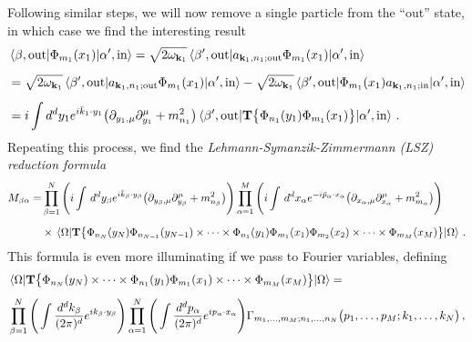 \documentclass{article}
\numberwithin{equation}{subsection}
\begin{document}
Following similar steps, we will now remove a single particle from the ``out'' state, in which case we find the interesting result
\begin{equation}\begin{split}
	&\mel{\beta,\text{out}}{\Phi_{m_1}(x_1)}{\alpha',\text{in}} = 
		\sqrt{2\omega_{\mathbf{k}_1}}\mel{\beta',\text{out}}{a_{\mathbf{k}_1,n_1;\text{out}}\Phi_{m_1}(x_1)}{\alpha',\text{in}}\\[0.5em]
	&=\sqrt{2\omega_{\mathbf{k}_1}}\mel{\beta',\text{out}}{a_{\mathbf{k}_1,n_1;\text{out}}\Phi_{m_1}(x_1)}{\alpha',\text{in}}
		- \sqrt{2\omega_{\mathbf{k}_1}}\mel{\beta',\text{out}}{\Phi_{m_1}(x_1)a_{\mathbf{k}_1,n_1;\text{in}}}{\alpha',\text{in}}\\[0.5em]
	&=i\int d^dy_1e^{i\bar{k}_1\cdot y_1}\big(\partial_{y_1,\mu}\partial^\mu_{y_1} + m_{n_1}^2\big)
		\mel{\beta',\text{out}}{\mathbf{T}\big\{\Phi_{n_1}(y_1)\Phi_{m_1}(x_1)\big\}}{\alpha',\text{in}}\,.
\end{split}\end{equation}
Repeating this process, we find the \textit{Lehmann-Symanzik-Zimmermann (LSZ) reduction formula}
\begin{equation}\begin{split}
	M_{\beta\alpha} = &\prod_{\beta=1}^N\Bigg(i\int\,d^d y_\beta e^{i\bar{k}_\beta\cdot y_\beta}\big(\partial_{y_\beta,\mu}\partial^\mu_{y_\beta} + m_{n_\beta}^2\big)\Bigg)
		\prod_{\alpha=1}^M\Bigg(i\int\,d^d x_\alpha e^{-i\bar{p}_\alpha\cdot x_\alpha}\big(\partial_{x_\alpha,\mu}\partial^\mu_{x_\alpha} + m_{m_\alpha}^2\big)\Bigg)\\[0.5em]
		&\times\mel{\Omega}{\mathbf{T}\big\{\Phi_{n_N}(y_N)\Phi_{n_{N-1}}(y_{N-1})\times\dots\times\Phi_{n_1}(y_1)
			\Phi_{m_1}(x_1)\Phi_{m_2}(x_2)\times\dots\times\Phi_{m_M}(x_M)\big\}}{\Omega}\,.
\end{split}\end{equation}
This formula is even more illuminating if we pass to Fourier variables, defining
\begin{equation}\begin{split}
	&\mel{\Omega}{\mathbf{T}\big\{\Phi_{n_N}(y_N)\times\dots\times\Phi_{n_1}(y_1)\Phi_{m_1}(x_1)\times\dots\times\Phi_{m_M}(x_M)\big\}}{\Omega} =\\[0.5em]
	&\prod_{\beta = 1}^N\Bigg(\int\frac{d^dk_\beta}{(2\pi)^d}e^{ik_\beta\cdot y_\beta}\Bigg)\prod_{\alpha = 1}^N\Bigg(\int\frac{d^dp_\alpha}{(2\pi)^d}e^{ip_\alpha\cdot x_\alpha}\Bigg)
	\Gamma_{m_1,\dots,m_M;n_1,\dots,n_N}\big(p_1,\dots,p_M;k_1,\dots,k_N\big)\,,
\end{split}\end{equation}
\end{document}
